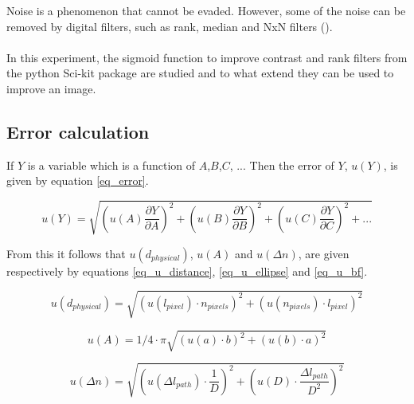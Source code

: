 Noise is a phenomenon that cannot be evaded. However, some of the noise can be removed by digital filters, such as rank, median and NxN filters (\cite{tutorial}). \\
\\
In this experiment, the sigmoid function to improve contrast and rank filters from the python Sci-kit package are studied and to what extend they can be used to improve an image.


\subsection{Error calculation}

If $Y$ is a variable which is a function of $A$,$B$,$C$, ... Then the error of $Y$, $u(Y)$, is given by equation \ref{eq_error}.

\begin{equation}
	\label{eq_error}
	u(Y) = \sqrt{\left(u(A) \frac{\partial Y}{\partial A}\right)^2 + \left(u(B) \frac{\partial Y}{\partial B}\right)^2 + \left(u(C) \frac{\partial Y}{\partial C}\right)^2 + ...}
\end{equation}

From this it follows that $u(d_{physical})$, $u(A)$ and $u(\Delta n)$, are given respectively by equations \ref{eq_u_distance}, \ref{eq_u_ellipse} and \ref{eq_u_bf}.

\begin{equation}
	\label{eq_u_distance}
	u(d_{physical}) = \sqrt{\left( u(l_{pixel}) \cdot n_{pixels} \right)^2 + \left( u(n_{pixels}) \cdot l_{pixel} \right)^2}
\end{equation}

\begin{equation}
	\label{eq_u_ellipse}
	u(A) = 1/4 \cdot \pi  \sqrt{(u(a) \cdot b)^2 + (u(b) \cdot a)^2}
\end{equation}

\begin{equation}
	\label{eq_u_bf}
	u(\Delta n) = \sqrt{\left( u(\Delta l_{path}) \cdot \frac{1}{D}\right)^2 + \left( u(D) \cdot \frac{\Delta l_{path}}{D^2}\right)^2}
\end{equation}

